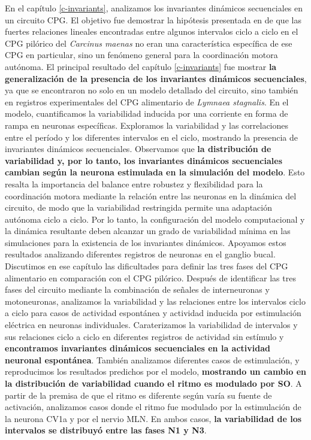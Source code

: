 En el capítulo \ref{c-invariants}, analizamos los invariantes dinámicos secuenciales en un circuito CPG. El objetivo fue demostrar la hipótesis presentada en \textcite{elices_robust_2019} de que las fuertes relaciones lineales encontradas entre algunos intervalos ciclo a ciclo en el CPG pilórico del \textit{Carcinus maenas} no eran una característica específica de ese CPG en particular, sino un fenómeno general para la coordinación motora autónoma. El principal resultado del capítulo \ref{c-invariants} fue mostrar \textbf{la generalización de la presencia de los invariantes dinámicos secuenciales}, ya que se encontraron no solo en un modelo detallado del circuito, sino también en registros experimentales del CPG alimentario de \textit{Lymnaea stagnalis}. En el modelo, cuantificamos la variabilidad inducida por una corriente en forma de rampa en neuronas específicas. Exploramos la variabilidad y las correlaciones entre el período y los diferentes intervalos en el ciclo, mostrando la presencia de invariantes dinámicos secuenciales. Observamos que \textbf{la distribución de variabilidad y, por lo tanto, los invariantes dinámicos secuenciales cambian según la neurona estimulada en la simulación del modelo}. Esto resalta la importancia del balance entre robustez y flexibilidad para la coordinación motora mediante la relación entre las neuronas en la dinámica del circuito, de modo que la variabilidad restringida permite una adaptación autónoma ciclo a ciclo. Por lo tanto, la configuración del modelo computacional y la dinámica resultante deben alcanzar un grado de variabilidad mínima en las simulaciones para la existencia de los invariantes dinámicos. Apoyamos estos resultados analizando diferentes registros de neuronas en el ganglio bucal. Discutimos en ese capítulo las dificultades para definir las tres fases del CPG alimentario en comparación con el CPG pilórico. Después de identificar las tres fases del circuito mediante la combinación de señales de interneuronas y motoneuronas, analizamos la variabilidad y las relaciones entre los intervalos ciclo a ciclo para casos de actividad espontánea y actividad inducida por estimulación eléctrica en neuronas individuales. Caraterizamos la variabilidad de intervalos y sus relaciones ciclo a ciclo en diferentes registros de actividad sin estímulo y \textbf{encontramos invariantes dinámicos secuenciales en la actividad neuronal espontánea}. También analizamos diferentes casos de estimulación, y reproducimos los resultados predichos por el modelo, \textbf{mostrando un cambio en la distribución de variabilidad cuando el ritmo es modulado por SO}. A partir de la premisa de que el ritmo es diferente según varía su fuente de activación, analizamos casos donde el ritmo fue modulado por la estimulación de la neurona CV1a y por el nervio MLN. En ambos casos, \textbf{la variabilidad de los intervalos se distribuyó entre las fases N1 y N3}.

